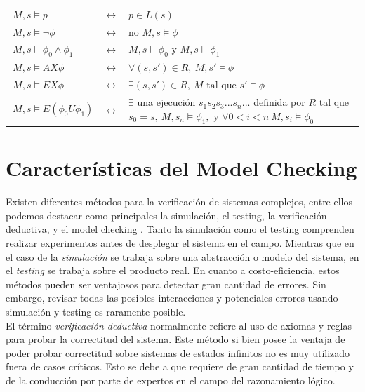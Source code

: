 \documentclass[titlepage, 12pt]{book}
\begin{document}
\begin{tabularx}{\textwidth}{@{\textbullet}lcX}
$~M,s \models p$ & $\leftrightarrow$ & $p \in L(s)$\\
$~M,s \models \neg\phi $ & $\leftrightarrow$ & $ \text{no } M,s \models \phi$\\
$~M,s \models \phi_0 \wedge \phi_1 $ & $\leftrightarrow$ & $ M,s \models \phi_0 \text{ y } M,s \models \phi_1$\\
$~M,s \models AX\phi $ & $\leftrightarrow$ & $ \forall (s,s') \in R,~ M,s' \models \phi$\\
$~M,s \models EX\phi $ & $\leftrightarrow$ & $ \exists (s,s') \in R,~M \text{ tal que } s' \models \phi$\\
$~M,s \models E(\phi_0 U \phi_1) $ & $\leftrightarrow$ & $\exists$ una ejecuci\'on $s_1s_2s_3...s_n...$ definida por $R$ tal que $s_0 = s,~M,s_n \models \phi_1,$ y $\forall 0<i<n~ M, s_i \models \phi_0$\\
\end{tabularx}








\section{Caracter\'isticas del Model Checking}
Existen diferentes m\'etodos para la verificaci\'on de sistemas complejos, entre ellos podemos destacar como principales la simulaci\'on, el testing, la verificaci\'on deductiva, y el model checking \cite{Clarke}. Tanto la simulaci\'on como el testing comprenden realizar experimentos antes de desplegar el sistema en el campo. Mientras que en el caso de la \textit{simulaci\'on} se trabaja sobre una abstracci\'on o modelo del sistema, en el \textit{testing} se trabaja sobre el producto real. En cuanto a costo-eficiencia, estos m\'etodos pueden ser ventajosos para detectar gran cantidad de errores. Sin embargo, revisar todas las posibles interacciones y potenciales errores usando simulaci\'on y testing es raramente posible.\\

El t\'ermino \textit{verificaci\'on deductiva} normalmente refiere al uso de axiomas y reglas para probar la correctitud del sistema. Este m\'etodo si bien posee la ventaja de poder probar correctitud sobre sistemas de estados infinitos no es muy utilizado fuera de casos cr\'iticos. Esto se debe a que requiere de gran cantidad de tiempo y de la conducci\'on por parte de expertos en el campo del razonamiento l\'ogico.\\
\end{document}
